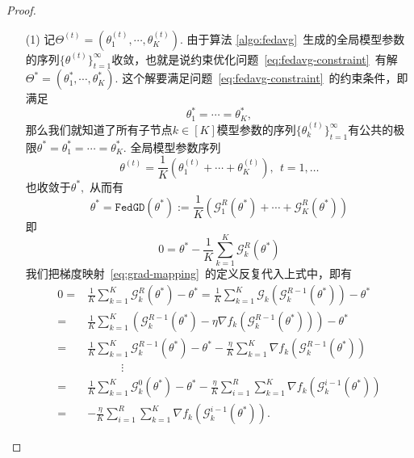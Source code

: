\begin{proof}
\begin{itemize}
\item[(1)] 记$\Theta^{(t)} = (\theta_1^{(t)}, \cdots, \theta_K^{(t)}).$ 由于算法 \ref{algo:fedavg}~生成的全局模型参数的序列$\{ \theta^{(t)} \}_{t=1}^{\infty}$收敛，也就是说约束优化问题~\eqref{eq:fedavg-constraint}~有解$\Theta^* = (\theta_1^*, \cdots, \theta_K^*).$ 这个解要满足问题~\eqref{eq:fedavg-constraint}~的约束条件，即满足
\begin{equation*}
\theta_1^* = \cdots = \theta_K^*,
\end{equation*}
那么我们就知道了所有子节点$k \in [K]$模型参数的序列$\{ \theta_k^{(t)} \}_{t=1}^{\infty}$有公共的极限$\theta^* = \theta_1^* = \cdots = \theta_K^*.$ 全局模型参数序列
\begin{equation*}
\theta^{(t)} = \frac{1}{K} (\theta_1^{(t)} + \cdots + \theta_K^{(t)}), ~~ t = 1, \ldots
\end{equation*}
也收敛于$\theta^*,$ 从而有
\begin{equation*}
\theta^* = \texttt{FedGD} (\theta^*) := \frac{1}{K} ( \mathcal{G}^R_1 (\theta^*) + \cdots + \mathcal{G}^R_K (\theta^*) )
\end{equation*}
即
\begin{equation*}
0 = \theta^* - \frac{1}{K} \sum\limits_{k=1}^K \mathcal{G}^R_k (\theta^*)
\end{equation*}
我们把梯度映射~\eqref{eq:grad-mapping}~的定义反复代入上式中，即有
\begin{align*}
0 = & \frac{1}{K}\sum_{k=1}^K \mathcal{G}^R_k(\theta^{*}) - \theta^{*} = \frac{1}{K} \sum_{k=1}^K \mathcal{G}_k ( \mathcal{G}^{R-1}_k (\theta^{*}) ) - \theta^{*} \\
= & \frac{1}{K}\sum_{k=1}^K \left( \mathcal{G}^{R-1}_k(\theta^{*}) - \eta\nabla f_k (\mathcal{G}^{R-1}_k(\theta^{*})) \right) - \theta^{*} \\
= & \frac{1}{K}\sum_{k=1}^K \mathcal{G}^{R-1}_k(\theta^{*}) - \theta^{*} - \frac{\eta}{K} \sum_{k=1}^K \nabla f_k (\mathcal{G}^{R-1}_k(\theta^{*})) \\
& \hspace{3em} \vdots \\
= & \frac{1}{K}\sum_{k=1}^K \mathcal{G}^{0}_k(\theta^{*}) - \theta^{*} - \frac{\eta}{K} \sum\limits_{i=1}^R \sum\limits_{k=1}^K \nabla f_k( \mathcal{G}_k^{i-1}(\theta^*) ) \\
= & - \frac{\eta}{K} \sum\limits_{i=1}^R \sum\limits_{k=1}^K \nabla f_k( \mathcal{G}_k^{i-1}(\theta^*) ).
\end{align*}

\end{itemize}
\end{proof}
